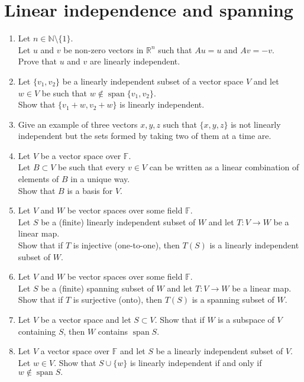 \documentclass{article}
\begin{document}
\section{Linear independence and spanning}
\begin{enumerate}
	\item Let $n \in \mathbb{N}\setminus\{1\}.$\\
	Let $u$ and $v$ be non-zero vectors in $\mathbb{R}^n$ such that $Au = u$ and $Av = -v.$\\
	Prove that $u$ and $v$ are linearly independent.
	\item Let $\{v_1,v_2\}$ be a linearly independent subset of a vector space $V$ and let $w\in V$ be such that $w \notin\operatorname{span}\{v_1,v_2\}$. \\
	Show that $\{v_1 + w, v_2 + w\}$ is linearly independent.
	\item Give an example of three vectors $x, y, z$ such that $\{x, y, z\}$ is not linearly independent but the sets formed by taking two of them at a time are.
	\item Let $V$ be a vector space over $\mathbb{F}.$\\
	Let $B \subset V$ be such that every $v \in V$ can be written as a linear combination of elements of $B$ in a unique way.\\
	Show that $B$ is a basis for $V.$
	\item Let $V$ and $W$ be vector spaces over some field $\mathbb{F}.$\\
	Let $S$ be a (finite) linearly independent subset of $W$ and let $T:V\to W$ be a linear map.\\
	Show that if $T$ is injective (one-to-one), then $T(S)$ is a linearly independent subset of $W.$
	\item Let $V$ and $W$ be vector spaces over some field $\mathbb{F}.$\\
	Let $S$ be a (finite) spanning subset of $W$ and let $T:V\to W$ be a linear map.\\
	Show that if $T$ is surjective (onto), then $T(S)$ is a spanning subset of $W.$
	\item Let $V$ be a vector space and let $S \subset V.$ Show that if $W$ is a subspace of $V$ containing $S$, then $W$ contains $\operatorname{span} S.$
	\item Let $V$ a vector space over $\mathbb{F}$ and let $S$ be a linearly independent subset of $V.$\\
	Let $w \in V.$ Show that $S \cup \{w\}$ is linearly independent if and only if $w \notin \operatorname{span} S.$

\end{enumerate}
\end{document}
